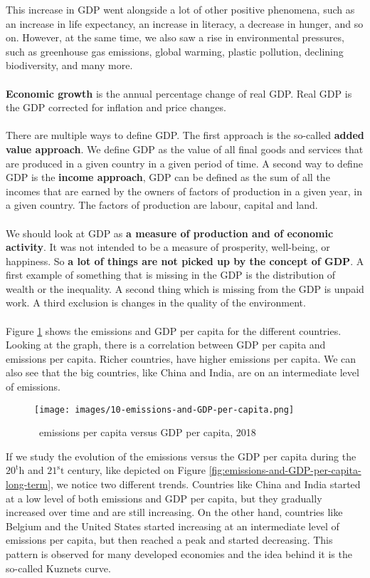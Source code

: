 \documentclass[../summary.tex]{subfiles}
\begin{document}
\newpage
This increase in GDP went alongside a lot of other positive phenomena, such as an increase in life expectancy, an increase in literacy, a decrease in hunger, and so on. However, at the same time, we also saw a rise in environmental pressures, such as greenhouse gas emissions, global warming, plastic pollution, declining biodiversity, and many more.
\\\\
\textbf{Economic growth} is the annual percentage change of real GDP. Real GDP is the GDP corrected for inflation and price changes.
\\\\
There are multiple ways to define GDP. The first approach is the so-called \textbf{added value approach}. We define GDP as the value of all final goods and services that are produced in a given country in a given period of time. A second way to define GDP is the \textbf{income approach}, GDP can be defined as the sum of all the incomes that are earned by the owners of factors of production in a given year, in a given country. The factors of production are labour, capital and land.
\\\\
We should look at GDP as \textbf{a measure of production and of economic activity}. It was not intended to be a measure of prosperity, well-being, or happiness. So \textbf{a lot of things are not picked up by the concept of GDP}. A first example of something that is missing in the GDP is the distribution of wealth or the inequality. A second thing which is missing from the GDP is unpaid work. A third exclusion is changes in the quality of the environment.
\\\\
Figure \ref{fig:emissions-and-GDP-per-capita} shows the emissions and GDP per capita for the different countries. Looking at the graph, there is a correlation between GDP per capita and emissions per capita. Richer countries, have higher emissions per capita. We can also see that the big countries, like China and India, are on an intermediate level of emissions.

\begin{figure}[htbp]
	\centering
	\texttt{[image: images/10-emissions-and-GDP-per-capita.png]}
	\caption{\COtwo\ emissions per capita versus GDP per capita, 2018}
	\label{fig:emissions-and-GDP-per-capita}
\end{figure}

If we study the evolution of the emissions versus the GDP per capita during the $\mathrm{20^th}$ and $\mathrm{21^st}$ century, like depicted on Figure \ref{fig:emissions-and-GDP-per-capita-long-term}, we notice two different trends. Countries like China and India started at a low level of both emissions and GDP per capita, but they gradually increased over time and are still increasing. On the other hand, countries like Belgium and the United States started increasing at an intermediate level of emissions per capita, but then reached a peak and started decreasing. This pattern is observed for many developed economies and the idea behind it is the so-called Kuznets curve.
\end{document}
